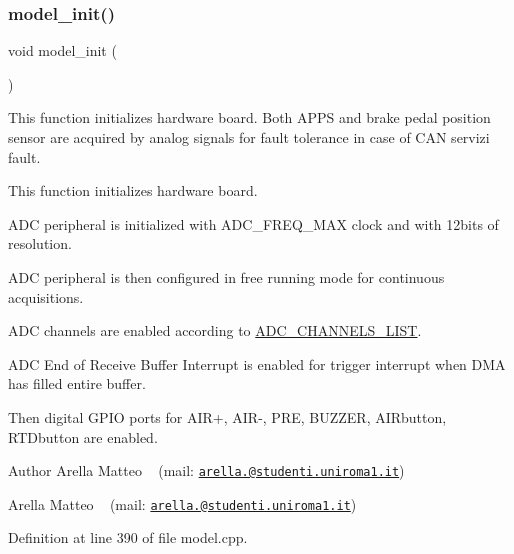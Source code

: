 \subsubsection{\texorpdfstring{model\+\_\+init()}{model\_init()}}
{\footnotesize\ttfamily void model\+\_\+init (\begin{DoxyParamCaption}{ }\end{DoxyParamCaption})}



This function initializes hardware board. Both A\+P\+PS and brake pedal position sensor are acquired by analog signals for fault tolerance in case of C\+AN servizi fault. 

This function initializes hardware board.

A\+DC peripheral is initialized with A\+D\+C\+\_\+\+F\+R\+E\+Q\+\_\+\+M\+AX clock and with 12bits of resolution.

A\+DC peripheral is then configured in free running mode for continuous acquisitions.

A\+DC channels are enabled according to \mbox{\hyperlink{group___board__model__group_ga8b6fbd5b46174be3b86bc1ab5daa9080}{A\+D\+C\+\_\+\+C\+H\+A\+N\+N\+E\+L\+S\+\_\+\+L\+I\+ST}}.

A\+DC End of Receive Buffer Interrupt is enabled for trigger interrupt when D\+MA has filled entire buffer.

Then digital G\+P\+IO ports for A\+I\+R+, A\+I\+R-\/, P\+RE, B\+U\+Z\+Z\+ER, A\+I\+Rbutton, R\+T\+Dbutton are enabled.

\begin{DoxyAuthor}{Author}
Arella Matteo ~\newline
 (mail\+: \href{mailto:arella.1646983@studenti.uniroma1.it}{\tt arella.@studenti.\+uniroma1.\+it})

Arella Matteo ~\newline
 (mail\+: \href{mailto:arella.1646983@studenti.uniroma1.it}{\tt arella.@studenti.\+uniroma1.\+it}) 
\end{DoxyAuthor}


Definition at line 390 of file model.\+cpp.

